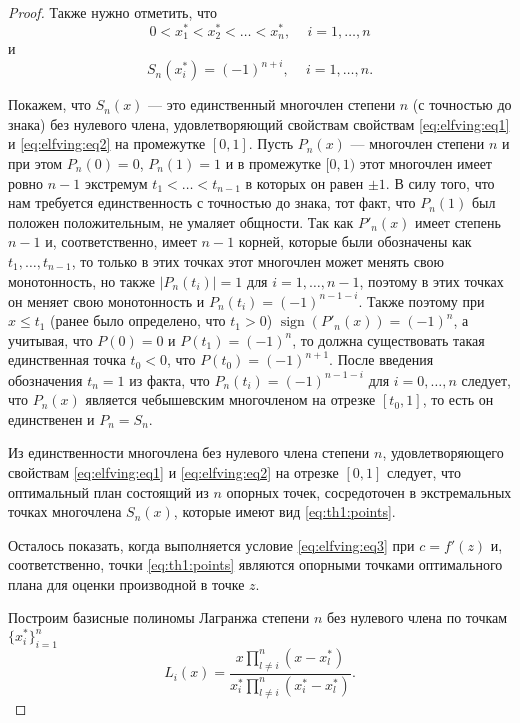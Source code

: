 \documentclass[specialist,
               substylefile = spbu.rtx,
               subf,href,colorlinks=true, 12pt]{disser}
\theoremstyle{definition}
\DeclareMathOperator*{\sign}{sign}
\newcommand\abs[1]{\left\lvert#1\right\rvert}
\begin{document}
\begin{proof}
	Также нужно отметить, что
	\begin{equation*}
		0 < x_1^* < x_2^* < \ldots < x_n^* , \, \quad i = 1, \ldots, n 
	\end{equation*}
	и
	\begin{equation*}
		S_n(x_i^*) = (-1)^{n + i} , \, \quad i = 1, \ldots, n .
	\end{equation*}
	
	Покажем, что $S_n(x)$ --- это единственный многочлен степени $n$ (с точностью до знака) без нулевого члена, удовлетворяющий свойствам свойствам \eqref{eq:elfving:eq1} и \eqref{eq:elfving:eq2} на промежутке $[0, 1]$. Пусть $P_n(x)$ --- многочлен степени $n$ и при этом $P_n(0) = 0$, $P_n(1) = 1$ и в промежутке $[0, 1)$ этот многочлен имеет ровно $n-1$ экстремум $t_1 < \ldots < t_{n-1}$ в которых он равен $\pm 1$. В силу того, что нам требуется единственность с точностью до знака, тот факт, что $P_n(1)$ был положен положительным, не умаляет общности. Так как $P'_n(x)$ имеет степень $n-1$ и, соответственно, имеет $n-1$ корней, которые были обозначены как $t_1, \ldots, t_{n-1}$, то только в этих точках этот многочлен может менять свою монотонность, но также $\abs{P_n(t_i)} = 1$ для $i = 1, \dots, n-1$, поэтому в этих точках он меняет свою монотонность и $P_n(t_i) = (-1)^{n-1-i}$. Также поэтому при $x \leqslant t_1$ (ранее было определено, что $t_1 > 0$) $\sign(P'_n(x)) = (-1)^n$, а учитывая, что $P(0) = 0$ и $P(t_1) = (-1)^n$, то должна существовать такая единственная точка $t_0 < 0$, что $P(t_0) = (-1)^{n+1}$. После введения обозначения $t_n = 1$ из факта, что $P_n(t_i) = (-1)^{n-1-i}$ для $i = 0, \ldots, n$ следует, что $P_n(x)$ является чебышевским многочленом на отрезке $[t_0, 1]$, то есть он единственен и $P_n = S_n$.
	
	Из единственности многочлена без нулевого члена степени $n$, удовлетворяющего свойствам \eqref{eq:elfving:eq1} и \eqref{eq:elfving:eq2} на отрезке $[0, 1]$ следует, что оптимальный план состоящий из $n$ опорных точек, сосредоточен в экстремальных точках многочлена $S_n(x)$, которые имеют вид \eqref{eq:th1:points}.
	
	Осталось показать, когда выполняется условие \eqref{eq:elfving:eq3} при $c = f'(z)$ и, соответственно, точки \eqref{eq:th1:points} являются опорными точками оптимального плана для оценки производной в точке $z$.

	Построим базисные полиномы Лагранжа степени $n$ без нулевого члена по точкам $\{x_i^*\}_{i=1}^n$
	\begin{equation*}
		L_{i}(x) = \frac{x \prod_{l \neq i}^n (x - x_l^*)}{x_i^* \prod_{l \neq i}^n (x_i^* - x_l^*)}.
	\end{equation*}	
	

\end{proof}
\end{document}
